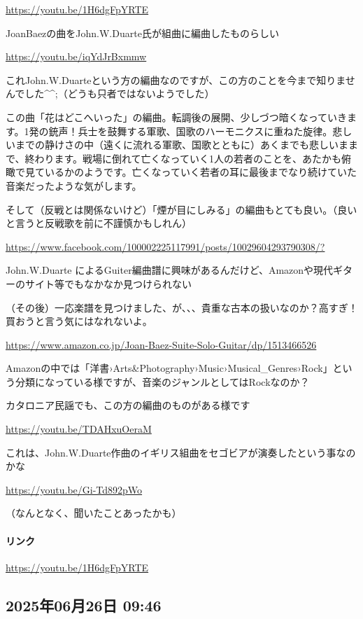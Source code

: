 \url{https://youtu.be/1H6dgFpYRTE}

JoanBaezの曲をJohn.W.Duarte氏が組曲に編曲したものらしい

\url{https://youtu.be/iqYdJrBxmmw}

これJohn.W.Duarteという方の編曲なのですが、この方のことを今まで知りませんでした\textasciicircum{}\textasciicircum{};（どうも只者ではないようでした）

この曲「花はどこへいった」の編曲。転調後の展開、少しづつ暗くなっていきます。1発の銃声！兵士を鼓舞する軍歌、国歌のハーモニクスに重ねた旋律。悲しいまでの静けさの中（遠くに流れる軍歌、国歌とともに）あくまでも悲しいままで、終わります。戦場に倒れて亡くなっていく1人の若者のことを、あたかも俯瞰で見ているかのようです。亡くなっていく若者の耳に最後までなり続けていた音楽だったような気がします。

そして（反戦とは関係ないけど）「煙が目にしみる」の編曲もとても良い。（良いと言うと反戦歌を前に不謹慎かもしれん）

\url{https://www.facebook.com/100002225117991/posts/10029604293790308/?}

John.W.Duarte によるGuiter編曲譜に興味があるんだけど、Amazonや現代ギターのサイト等でもなかなか見つけられない

（その後）一応楽譜を見つけました、が、、、貴重な古本の扱いなのか？高すぎ！買おうと言う気にはなれないよ。

\url{https://www.amazon.co.jp/Joan-Baez-Suite-Solo-Guitar/dp/1513466526}

Amazonの中では「洋書›Arts\&Photography›Music›Musical\_Genres›Rock」という分類になっている様ですが、音楽のジャンルとしてはRockなのか？

カタロニア民謡でも、この方の編曲のものがある様です

\url{https://youtu.be/TDAHxuOeraM}

これは、John.W.Duarte作曲のイギリス組曲をセゴビアが演奏したという事なのかな

\url{https://youtu.be/Gi-Td892pWo}

（なんとなく、聞いたことあったかも）

\paragraph{リンク}
\url{https://youtu.be/1H6dgFpYRTE}

\subsection*{2025年06月26日 09:46}

